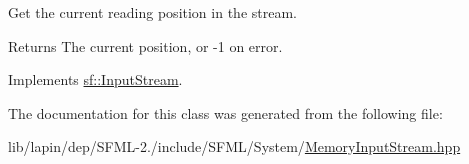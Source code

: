 Get the current reading position in the stream. 

\begin{DoxyReturn}{Returns}
The current position, or -\/1 on error. 
\end{DoxyReturn}


Implements \hyperlink{classsf_1_1_input_stream_a599515b9ccdbddb6fef5a98424fd559c}{sf\-::\-Input\-Stream}.



The documentation for this class was generated from the following file\-:\begin{DoxyCompactItemize}
\item 
lib/lapin/dep/\-S\-F\-M\-L-\/2./include/\-S\-F\-M\-L/\-System/\hyperlink{lapin_2dep_2_s_f_m_l-2_83_2include_2_s_f_m_l_2_system_2_memory_input_stream_8hpp}{Memory\-Input\-Stream.\-hpp}\end{DoxyCompactItemize}
